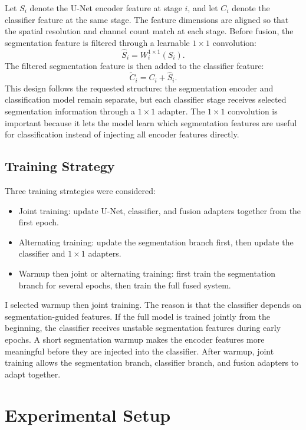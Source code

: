 \documentclass[10pt,conference]{IEEEtran}
\begin{document}
Let $S_i$ denote the U-Net encoder feature at stage $i$, and let $C_i$ denote the classifier feature at the same stage. The feature dimensions are aligned so that the spatial resolution and channel count match at each stage. Before fusion, the segmentation feature is filtered through a learnable $1\times1$ convolution:
\begin{equation}
    \hat{S}_i = W_i^{1\times1}(S_i).
\end{equation}
The filtered segmentation feature is then added to the classifier feature:
\begin{equation}
    \tilde{C}_i = C_i + \hat{S}_i.
\end{equation}
This design follows the requested structure: the segmentation encoder and classification model remain separate, but each classifier stage receives selected segmentation information through a $1\times1$ adapter. The $1\times1$ convolution is important because it lets the model learn which segmentation features are useful for classification instead of injecting all encoder features directly.

\subsection{Training Strategy}
Three training strategies were considered:
\begin{itemize}
    \item Joint training: update U-Net, classifier, and fusion adapters together from the first epoch.
    \item Alternating training: update the segmentation branch first, then update the classifier and $1\times1$ adapters.
    \item Warmup then joint or alternating training: first train the segmentation branch for several epochs, then train the full fused system.
\end{itemize}
I selected warmup then joint training. The reason is that the classifier depends on segmentation-guided features. If the full model is trained jointly from the beginning, the classifier receives unstable segmentation features during early epochs. A short segmentation warmup makes the encoder features more meaningful before they are injected into the classifier. After warmup, joint training allows the segmentation branch, classifier branch, and fusion adapters to adapt together.

\section{Experimental Setup}
\end{document}
